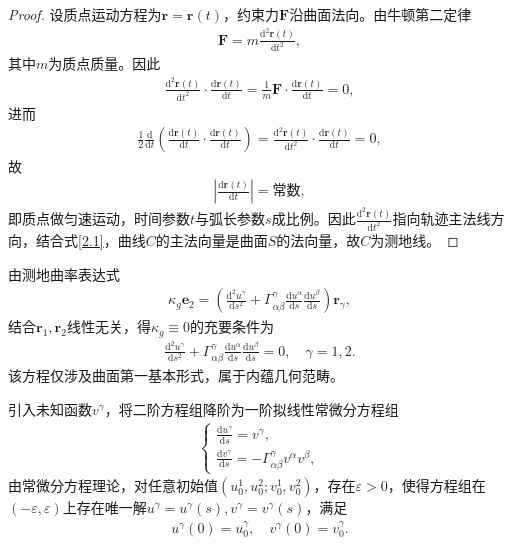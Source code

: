 \documentclass[../../main.tex]{subfiles}%
\begin{document}
\begin{proof}
设质点运动方程为$\boldsymbol{r}=\boldsymbol{r}(t)$，约束力$\boldsymbol{F}$沿曲面法向。由牛顿第二定律
\begin{align}
\boldsymbol{F}=m\frac{\mathrm{d}^2\boldsymbol{r}(t)}{\mathrm{d}t^2},
\end{align}
其中$m$为质点质量。因此
\begin{align*}
\frac{\mathrm{d}^2\boldsymbol{r}(t)}{\mathrm{d}t^2}\cdot\frac{\mathrm{d}\boldsymbol{r}(t)}{\mathrm{d}t}=\frac{1}{m}\boldsymbol{F}\cdot\frac{\mathrm{d}\boldsymbol{r}(t)}{\mathrm{d}t}=0,
\end{align*}
进而
\begin{align*}
\frac{1}{2}\frac{\mathrm{d}}{\mathrm{d}t}\left(\frac{\mathrm{d}\boldsymbol{r}(t)}{\mathrm{d}t}\cdot\frac{\mathrm{d}\boldsymbol{r}(t)}{\mathrm{d}t}\right)=\frac{\mathrm{d}^2\boldsymbol{r}(t)}{\mathrm{d}t^2}\cdot\frac{\mathrm{d}\boldsymbol{r}(t)}{\mathrm{d}t}=0,
\end{align*}
故
\begin{align}
\left|\frac{\mathrm{d}\boldsymbol{r}(t)}{\mathrm{d}t}\right|=\text{常数},
\end{align}
即质点做匀速运动，时间参数$t$与弧长参数$s$成比例。因此$\frac{\mathrm{d}^2\boldsymbol{r}(t)}{\mathrm{d}t^2}$指向轨迹主法线方向，结合式\eqref{2.1}，曲线$C$的主法向量是曲面$S$的法向量，故$C$为测地线。
\end{proof}

由测地曲率表达式
\begin{align}
\kappa_g \boldsymbol{e}_2=\left(\frac{\mathrm{d}^2u^\gamma}{\mathrm{d}s^2}+\Gamma^\gamma_{\alpha\beta}\frac{\mathrm{d}u^\alpha}{\mathrm{d}s}\frac{\mathrm{d}u^\beta}{\mathrm{d}s}\right)\boldsymbol{r}_\gamma,
\end{align}
结合$\boldsymbol{r}_1,\boldsymbol{r}_2$线性无关，得$\kappa_g\equiv0$的充要条件为
\begin{align}
\frac{\mathrm{d}^2u^\gamma}{\mathrm{d}s^2}+\Gamma^\gamma_{\alpha\beta}\frac{\mathrm{d}u^\alpha}{\mathrm{d}s}\frac{\mathrm{d}u^\beta}{\mathrm{d}s}=0,\quad \gamma=1,2.
\end{align}
该方程仅涉及曲面第一基本形式，属于内蕴几何范畴。

引入未知函数$v^\gamma$，将二阶方程组降阶为一阶拟线性常微分方程组
\begin{align}
\begin{cases}
\frac{\mathrm{d}u^\gamma}{\mathrm{d}s}=v^\gamma,\\
\frac{\mathrm{d}v^\gamma}{\mathrm{d}s}=-\Gamma^\gamma_{\alpha\beta}v^\alpha v^\beta,
\end{cases}
\end{align}
由常微分方程理论，对任意初始值$(u_0^1,u_0^2;v_0^1,v_0^2)$，存在$\varepsilon>0$，使得方程组在$(-\varepsilon,\varepsilon)$上存在唯一解$u^\gamma=u^\gamma(s),v^\gamma=v^\gamma(s)$，满足
\begin{align}
u^\gamma(0)=u_0^\gamma,\quad v^\gamma(0)=v_0^\gamma.
\end{align}
\end{document}
